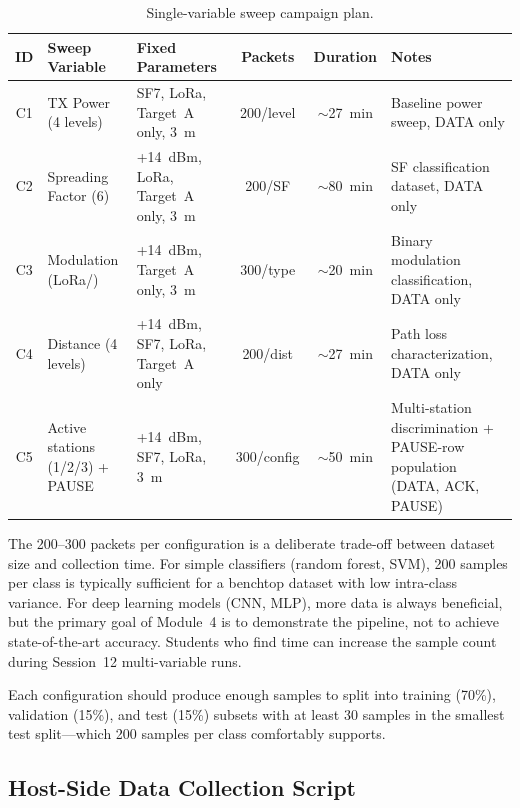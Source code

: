 \documentclass[11pt,letterpaper]{article}
\begin{document}
	\begin{table}[ht!]
		\centering
		\caption{Single-variable sweep campaign plan.}
		\label{tab:campaigns}
		\renewcommand{\arraystretch}{1.3}
		\begin{tabularx}{\textwidth}{c l l c c X}
			\toprule
			\textbf{ID} & \textbf{Sweep Variable} & \textbf{Fixed Parameters} & \textbf{Packets} & \textbf{Duration} & \textbf{Notes} \\
			\midrule
			C1 & TX Power (4 levels) & SF7, LoRa, Target~A only, 3~m & 200/level & $\sim$27~min & Baseline power sweep, DATA only \\
			C2 & Spreading Factor (6) & +14~dBm, LoRa, Target~A only, 3~m & 200/SF & $\sim$80~min & SF classification dataset, DATA only \\
			C3 & Modulation (LoRa/\FSK{}) & +14~dBm, Target~A only, 3~m & 300/type & $\sim$20~min & Binary modulation classification, DATA only \\
			C4 & Distance (4 levels) & +14~dBm, SF7, LoRa, Target~A only & 200/dist & $\sim$27~min & Path loss characterization, DATA only \\
			C5 & Active stations (1/2/3) + PAUSE & +14~dBm, SF7, LoRa, 3~m & 300/config & $\sim$50~min & Multi-station discrimination + PAUSE-row population (DATA, ACK, PAUSE) \\
			\bottomrule
		\end{tabularx}
	\end{table}

	\begin{tcolorbox}[infobox={Design Principle: Packets Per Configuration}]
		The 200--300 packets per configuration is a deliberate trade-off between dataset size and collection time. For simple classifiers (random forest, SVM), 200 samples per class is typically sufficient for a benchtop dataset with low intra-class variance. For deep learning models (CNN, MLP), more data is always beneficial, but the primary goal of Module~4 is to demonstrate the \ML{} pipeline, not to achieve state-of-the-art accuracy. Students who find time can increase the sample count during Session~12 multi-variable runs.

		Each configuration should produce enough samples to split into training (70\%), validation (15\%), and test (15\%) subsets with at least 30 samples in the smallest test split---which 200 samples per class comfortably supports.
	\end{tcolorbox}

	\subsection{Host-Side Data Collection Script}
\end{document}
